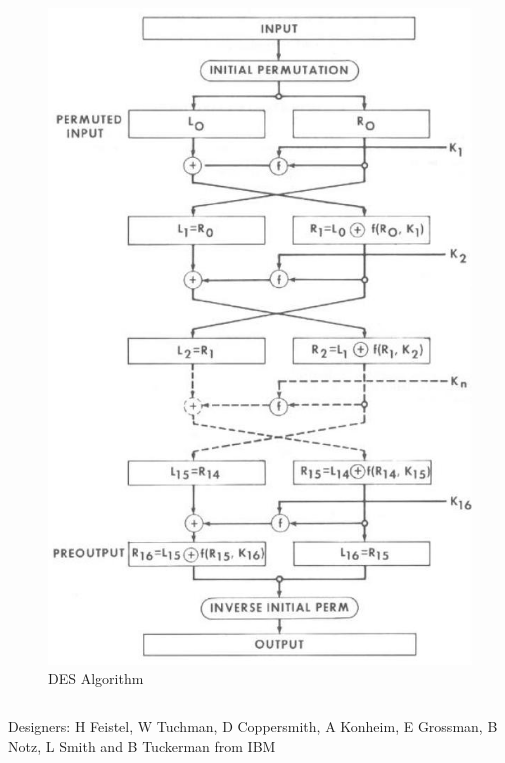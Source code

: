 \documentclass[9pt]{beamer}
\begin{document}
\begin{frame}
\begin{columns}
\begin{column}{0.4\textwidth}
\begin{figure}
\includegraphics[totalheight=0.8\textheight]{des_algo.jpg}
\caption{DES Algorithm}
\end{figure}
\end{column}
\end{columns}

{\tiny Designers: H Feistel, W Tuchman, D Coppersmith, A Konheim, E Grossman, B Notz, L Smith and B Tuckerman from IBM}
\end{frame}
\end{document}
